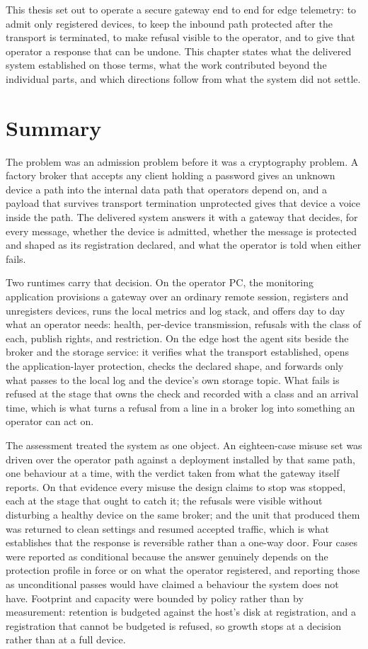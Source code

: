 \documentclass[12pt,a4paper]{report}
\begin{document}
This thesis set out to operate a secure gateway end to end
for edge telemetry: to admit only registered devices, to
keep the inbound path protected after the transport is
terminated, to make refusal visible to the operator, and to
give that operator a response that can be undone. This
chapter states what the delivered system established on
those terms, what the work contributed beyond the
individual parts, and which directions follow from what the
system did not settle.

\section{Summary}

The problem was an admission problem before it was a
cryptography problem. A factory broker that accepts any
client holding a password gives an unknown device a path
into the internal data path that operators depend on, and a
payload that survives transport termination unprotected
gives that device a voice inside the path. The delivered
system answers it with a gateway that decides, for every
message, whether the device is admitted, whether the message
is protected and shaped as its registration declared, and
what the operator is told when either fails.

Two runtimes carry that decision. On the operator PC, the
monitoring application provisions a gateway over an ordinary
remote session, registers and unregisters devices, runs the
local metrics and log stack, and offers day to day what an
operator needs: health, per-device transmission, refusals
with the class of each, publish rights, and restriction. On
the edge host the agent sits beside the broker and the
storage service: it verifies what the transport established,
opens the application-layer protection, checks the declared
shape, and forwards only what passes to the local log and
the device's own storage topic. What fails is refused at the
stage that owns the check and recorded with a class and an
arrival time, which is what turns a refusal from a line in a
broker log into something an operator can act on.

The assessment treated the system as one object. An
eighteen-case misuse set was driven over the operator path
against a deployment installed by that same path, one
behaviour at a time, with the verdict taken from what the
gateway itself reports. On that evidence every misuse the
design claims to stop was stopped, each at the stage that
ought to catch it; the refusals were visible without
disturbing a healthy device on the same broker; and the unit
that produced them was returned to clean settings and
resumed accepted traffic, which is what establishes that the
response is reversible rather than a one-way door. Four
cases were reported as conditional because the answer
genuinely depends on the protection profile in force or on
what the operator registered, and reporting those as
unconditional passes would have claimed a behaviour the
system does not have. Footprint and capacity were bounded by
policy rather than by measurement: retention is budgeted
against the host's disk at registration, and a registration
that cannot be budgeted is refused, so growth stops at a
decision rather than at a full device.
\end{document}
